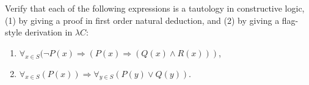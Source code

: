 \begin{problem}{7.9}
    Verify that each of the following expressions is a tautology in constructive logic, (1) by giving a proof in first order natural deduction, and (2) by giving a flag-style derivation in $\lambda C$:
    \begin{enumerate}[label=$(\alph*)$]
    \item $\forall_{x \in S}(\neg P(x) \Rightarrow (P(x) \Rightarrow (Q(x) \land R(x)))$,
    \item $\forall_{x \in S}(P(x)) \Rightarrow \forall_{y \in S}(P(y) \lor Q(y))$.
    \end{enumerate}
\end{problem}